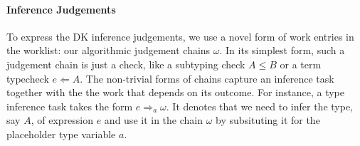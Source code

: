 
\paragraph{Inference Judgements}
To express the DK inference judgements, we use a novel form of work entries in
the worklist: our algorithmic judgement chains $\omega$. In its simplest form,
such a judgement chain is just a check, like a subtyping check $A \leq B$ or a
term typecheck $e \Leftarrow A$.  The non-trivial forms of chains capture an
inference task together with the the work that depends on its outcome. For
instance, a type inference task takes the form $e \Rightarrow_a \omega$. It
denotes that we need to infer the type, say $A$, of expression $e$ and use it
in the chain $\omega$ by subsituting it for the placeholder type variable $a$.




